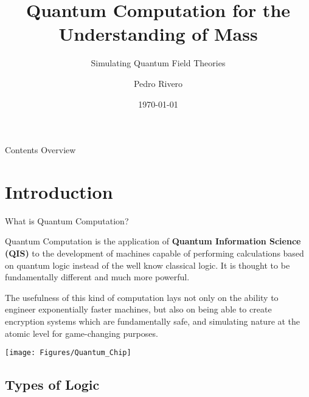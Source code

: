 \documentclass[9pt, handout, aspectratio=169]{beamer}	%
\title{Quantum Computation for the Understanding of Mass}
\subtitle{Simulating Quantum Field Theories}
\author{Pedro Rivero}
\institute{Illinois Institute of Technology \\ Argonne National Laboratory}
\date{\today}
\begin{document}
	\justify
	\setlength{\abovedisplayskip}{0pt}
	\setlength{\belowdisplayskip}{12pt}
	\setlength{\abovedisplayshortskip}{0pt}
	\setlength{\belowdisplayshortskip}{12pt}

\begin{frame}[plain,t]
	\titlepage
\end{frame}

\begin{frame}[c]{Contents Overview}
	\tableofcontents
\end{frame}



\section{Introduction}

\begin{frame}{What is Quantum Computation?}

	Quantum Computation is the application of \textbf{Quantum Information Science (QIS)} to the development of machines capable of performing calculations based on quantum logic instead of the well know classical logic. It is thought to be fundamentally different and much more powerful.

	\begin{multicols}{2}

	The usefulness of this kind of computation lays not only on the ability to engineer exponentially faster machines, but also on being able to create encryption systems which are fundamentally safe, and simulating nature at the atomic level for game-changing purposes.

		\begin{center}
	\texttt{[image: Figures/Quantum\_Chip]}
		\end{center}

	\end{multicols}

\end{frame}



\subsection{Types of Logic}
\end{document}

